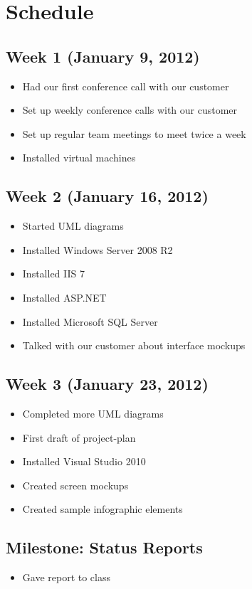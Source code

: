 \documentclass[11pt,a4paper,oneside]{article}
\begin{document}
\newpage

\section{Schedule}

\subsection{Week 1 (January 9, 2012)}
\begin{itemize}
\item Had our first conference call with our customer
\item Set up weekly conference calls with our customer
\item Set up regular team meetings to meet twice a week
\item Installed virtual machines
\end{itemize}


\subsection{Week 2 (January 16, 2012)}
\begin{itemize}
\item Started UML diagrams
\item Installed Windows Server 2008 R2
\item Installed IIS 7
\item Installed ASP.NET
\item Installed Microsoft SQL Server
\item Talked with our customer about interface mockups
\end{itemize}

\subsection{Week 3 (January 23, 2012)}
\begin{itemize}
\item Completed more UML diagrams
\item First draft of project-plan
\item Installed Visual Studio 2010
\item Created screen mockups
\item Created sample infographic elements
\end{itemize}

\subsection{Milestone: Status Reports}
\begin{itemize}
\item Gave report to class
\end{itemize}
\end{document}
